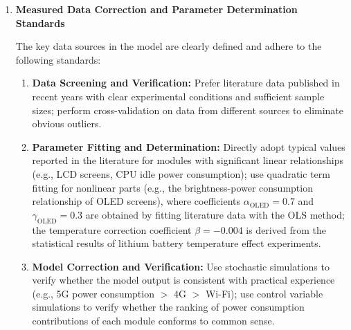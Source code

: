 \documentclass{mcmthesis}  %
\begin{document}
\begin{enumerate}[label=\bfseries\arabic*.]
		Given the lack of large-scale measured data, we adopts a parameter calibration method based on normalized behavioral variables. This approach first normalizes behavior variables that cannot be directly measured (such as screen brightness, CPU utilization, and network load) to the range of $[0,1]$ to eliminate dimensional effects. Subsequently, power consumption models are constructed in a modular manner, with coefficients derived from the mean values or fitting results of empirically measured data in the literature, ensuring that each component of the model has clear physical significance. Finally, to avoid the limitations of machine learning methods-such as high demand for labeled data, poor generalization ability, and lack of physical interpretability of parameters—this method is built on a mechanism-driven foundation, balancing interpretability and engineering applicability.
		
		\item \textbf{Measured Data Correction and Parameter Determination Standards}
		
		The key data sources in the model are clearly defined and adhere to the following standards:
		\begin{enumerate}[label=\textbf{(\arabic*)}]
			\item \textbf{Data Screening and Verification:} Prefer literature data published in recent years with clear experimental conditions and sufficient sample sizes; perform cross-validation on data from different sources to eliminate obvious outliers.
			\item \textbf{Parameter Fitting and Determination:} Directly adopt typical values reported in the literature for modules with significant linear relationships (e.g., LCD screens, CPU idle power consumption); use quadratic term fitting for nonlinear parts (e.g., the brightness-power consumption relationship of OLED screens), where coefficients $\alpha_{\text{OLED}}=0.7$ and $\gamma_{\text{OLED}}=0.3$ are obtained by fitting literature data with the OLS method; the temperature correction coefficient $\beta=-0.004$ is derived from the statistical results of lithium battery temperature effect experiments.
			\item \textbf{Model Correction and Verification:} Use stochastic simulations to verify whether the model output is consistent with practical experience (e.g., 5G power consumption $>$ 4G $>$ Wi-Fi); use control variable simulations to verify whether the ranking of power consumption contributions of each module conforms to common sense.
		\end{enumerate}
	\end{enumerate}
	
\end{document}
